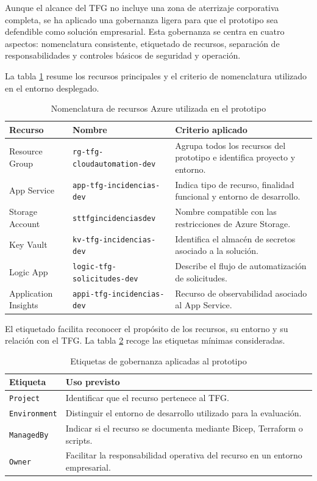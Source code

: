 Aunque el alcance del TFG no incluye una zona de aterrizaje corporativa completa, se ha aplicado una gobernanza ligera para que el prototipo sea defendible como solución empresarial. Esta gobernanza se centra en cuatro aspectos: nomenclatura consistente, etiquetado de recursos, separación de responsabilidades y controles básicos de seguridad y operación.

La tabla \ref{tabla:nomenclatura_recursos_azure} resume los recursos principales y el criterio de nomenclatura utilizado en el entorno desplegado.

\begin{table}[h]
\centering
\small
\begin{tabularx}{\textwidth}{l l X}
\textbf{Recurso} & \textbf{Nombre} & \textbf{Criterio aplicado} \\
\hline
Resource Group & \texttt{rg-tfg-cloudautomation-dev} & Agrupa todos los recursos del prototipo e identifica proyecto y entorno. \\
App Service & \texttt{app-tfg-incidencias-dev} & Indica tipo de recurso, finalidad funcional y entorno de desarrollo. \\
Storage Account & \texttt{sttfgincidenciasdev} & Nombre compatible con las restricciones de Azure Storage. \\
Key Vault & \texttt{kv-tfg-incidencias-dev} & Identifica el almacén de secretos asociado a la solución. \\
Logic App & \texttt{logic-tfg-solicitudes-dev} & Describe el flujo de automatización de solicitudes. \\
Application Insights & \texttt{appi-tfg-incidencias-dev} & Recurso de observabilidad asociado al App Service. \\
\end{tabularx}
\caption{Nomenclatura de recursos Azure utilizada en el prototipo}
\label{tabla:nomenclatura_recursos_azure}
\end{table}

El etiquetado facilita reconocer el propósito de los recursos, su entorno y su relación con el TFG. La tabla \ref{tabla:etiquetado_recursos} recoge las etiquetas mínimas consideradas.

\begin{table}[h]
\centering
\small
\begin{tabularx}{\textwidth}{l X}
\textbf{Etiqueta} & \textbf{Uso previsto} \\
\hline
\texttt{Project} & Identificar que el recurso pertenece al TFG. \\
\texttt{Environment} & Distinguir el entorno de desarrollo utilizado para la evaluación. \\
\texttt{ManagedBy} & Indicar si el recurso se documenta mediante Bicep, Terraform o scripts. \\
\texttt{Owner} & Facilitar la responsabilidad operativa del recurso en un entorno empresarial. \\
\end{tabularx}
\caption{Etiquetas de gobernanza aplicadas al prototipo}
\label{tabla:etiquetado_recursos}
\end{table}

